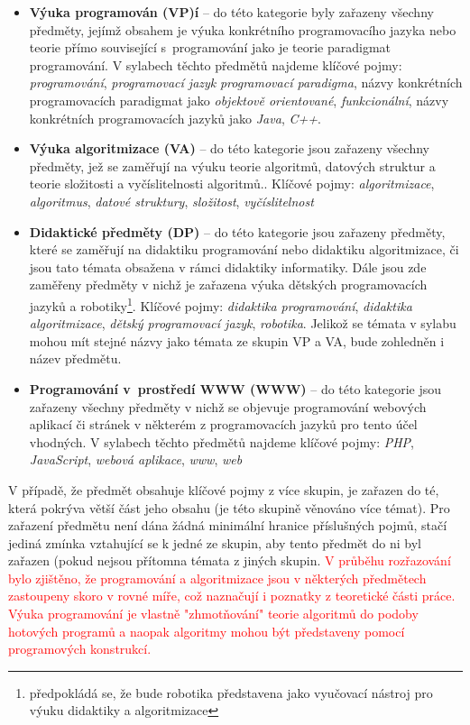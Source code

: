\documentclass[FP,DP]{tulthesis}
\begin{document}
{{{{{{{\vspace{2mm}\begin{itemize}
\setlength\itemsep{0.2em}
  	\item \textbf{Výuka programován (VP)í} -- do této kategorie byly zařazeny všechny předměty, jejímž obsahem je výuka konkrétního programovacího jazyka nebo teorie přímo související s~programování jako je teorie paradigmat programování. V sylabech těchto předmětů najdeme klíčové pojmy: \textit{programování}, \textit{programovací jazyk} \textit{programovací paradigma}, názvy konkrétních programovacích paradigmat jako \textit{objektově orientované}, \textit{funkcionální},  názvy konkrétních programovacích jazyků jako \textit{Java}, \textit{C++}.
\item \textbf{Výuka algoritmizace  (VA)} -- do této kategorie jsou zařazeny všechny předměty, jež se zaměřují na výuku teorie algoritmů, datových struktur a teorie složitosti a vyčíslitelnosti algoritmů.. Klíčové pojmy: \textit{algoritmizace}, \textit{algoritmus}, \textit{datové struktury}, \textit{složitost}, \textit{vyčíslitelnost}
\item \textbf{Didaktické předměty (DP)} -- do této kategorie jsou zařazeny předměty, které se zaměřují na didaktiku programování nebo didaktiku algoritmizace, či jsou tato témata obsažena v rámci didaktiky informatiky. Dále jsou zde zaměřeny předměty v nichž je zařazena výuka dětských programovacích jazyků a robotiky\footnote{předpokládá se, že bude robotika představena jako vyučovací nástroj pro výuku didaktiky a algoritmizace}. Klíčové pojmy: \textit{didaktika programování}, \textit{didaktika algoritmizace}, \textit{dětský programovací jazyk}, \textit{robotika}. Jelikož se témata v sylabu mohou mít stejné názvy jako témata ze skupin VP a VA, bude zohledněn i název předmětu.
	\item \textbf{Programování v~prostředí WWW (WWW)} -- do této kategorie jsou zařazeny všechny předměty v nichž se objevuje programování webových aplikací či stránek v některém z programovacích jazyků pro tento účel vhodných. V sylabech těchto předmětů najdeme klíčové pojmy: \textit{PHP}, \textit{JavaScript}, \textit{webová aplikace}, \textit{www}, \textit{web}
\end{itemize}
V případě, že předmět obsahuje klíčové pojmy z více skupin, je zařazen do té, která pokrýva větší část jeho obsahu (je této skupině věnováno více témat). Pro zařazení předmětu není dána žádná minimální hranice příslušných pojmů, stačí jediná zmínka vztahující se k jedné ze skupin, aby tento předmět do ni byl zařazen (pokud nejsou přítomna témata z jiných skupin. \textcolor{red}{V průběhu rozřazování bylo zjištěno, že programování a algoritmizace jsou v některých předmětech zastoupeny skoro v rovné míře, což naznačují i poznatky z teoretické části práce. Výuka programování je vlastně "zhmotňování" teorie algoritmů do podoby hotových programů a naopak algoritmy mohou být představeny pomocí programových konstrukcí.}
\begin{figure}[h!]
\centering
{}


\end{figure}}}}}}}}
\end{document}
